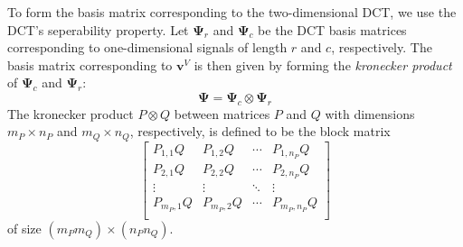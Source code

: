 To form the basis matrix corresponding to the two-dimensional DCT, we use the DCT's seperability property.
Let $\bm\Psi_r$ and $\bm\Psi_c$ be the DCT basis matrices corresponding to one-dimensional signals of length $r$ and $c$, respectively.
The basis matrix corresponding to $\bm v^V$ is then given by forming the \emph{kronecker product} of $\bm\Psi_c$ and $\bm\Psi_r$:
\begin{equation*}
\label{eqn:dct3_basis}
  \bm\Psi = \bm\Psi_c \otimes \bm\Psi_r
\end{equation*}
The kronecker product $P \otimes Q$ between matrices $P$ and $Q$ with dimensions $m_P \times n_P$ and $m_Q \times n_Q$, respectively,  is defined to be the block matrix
\begin{equation}
\label{eqn:kron}
\begin{bmatrix}
P_{1,1} Q & P_{1,2} Q & \cdots & P_{1,n_P} Q \\
P_{2,1} Q & P_{2,2} Q & \cdots & P_{2,n_P} Q \\
\vdots&\vdots&\ddots&\vdots \\
P_{m_P,1} Q & P_{m_P,2} Q & \cdots & P_{m_P,n_P} Q \\
\end{bmatrix}
\end{equation}
of size $(m_Pm_Q) \times (n_Pn_Q)$.

